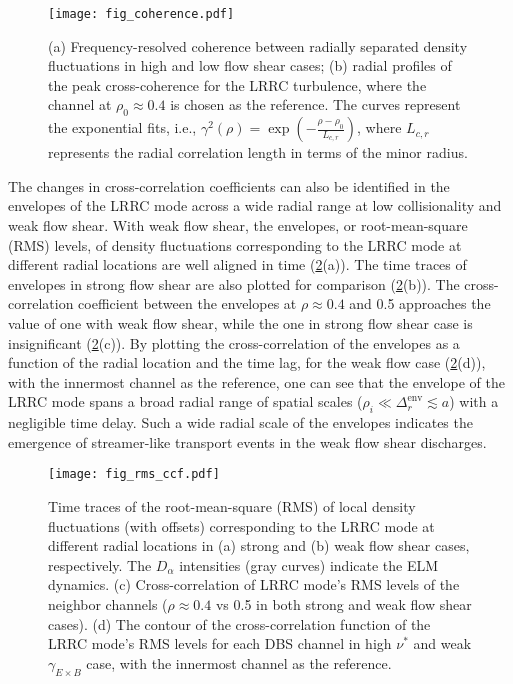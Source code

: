 \documentclass[english,aip,pop,superscriptaddress,preprint,letterpaper]{revtex4-2}
\begin{document}
\begin{figure}
    \texttt{[image: fig\_coherence.pdf]}
    \caption{\label{fig:coherence}(a) Frequency-resolved coherence between radially separated density fluctuations in high and low flow shear cases; (b) radial profiles of the peak cross-coherence for the LRRC turbulence, where the channel at $\rho_{0}\approx0.4$ is chosen as the reference. The curves represent the exponential fits, i.e., $\gamma^{2}(\rho)=\exp(-\frac{\rho-\rho_{0}}{L_{c,r}})$, where $L_{c,r}$ represents the radial correlation length in terms of the minor radius.}
\end{figure}

The changes in cross-correlation coefficients can also be identified in the envelopes of the LRRC mode across a wide radial range at low collisionality and weak flow shear.
With weak flow shear, the envelopes, or root-mean-square (RMS) levels, of density fluctuations corresponding to the LRRC mode at different radial locations are well aligned in time (\cref{fig:rms_ccf}(a)).
The time traces of envelopes in strong flow shear are also plotted for comparison (\cref{fig:rms_ccf}(b)).
The cross-correlation coefficient between the envelopes at $\rho\approx0.4$ and 0.5 approaches the value of one with weak flow shear, while the one in strong flow shear case is insignificant (\cref{fig:rms_ccf}(c)). 
By plotting the cross-correlation of the envelopes as a function of the radial location and the time lag, for the weak flow case (\cref{fig:rms_ccf}(d)), with the innermost channel as the reference, one can see that the envelope of the LRRC mode spans a broad radial range of spatial scales ($\rho_{i}\ll\Delta_{r}^{\mathrm{env}}\lesssim a$) with a negligible time delay. 
Such a wide radial scale of the envelopes indicates the emergence of streamer-like transport events in the weak flow shear discharges.

\begin{figure}
    \texttt{[image: fig\_rms\_ccf.pdf]}
    \caption{\label{fig:rms_ccf} Time traces of the root-mean-square (RMS) of local density fluctuations (with offsets) corresponding to the LRRC mode at different radial locations in (a) strong and (b) weak flow shear cases, respectively. The $D_{\alpha}$ intensities (gray curves) indicate the ELM dynamics. (c) Cross-correlation of LRRC mode's RMS levels of the neighbor channels ($\rho\approx 0.4$ vs 0.5 in both strong and weak flow shear cases). (d) The contour of the cross-correlation function of the LRRC mode's RMS levels for each DBS channel in high $\nu^*$ and weak $\gamma_{E\times B}$ case, with the innermost channel as the reference.}
\end{figure}
\end{document}
